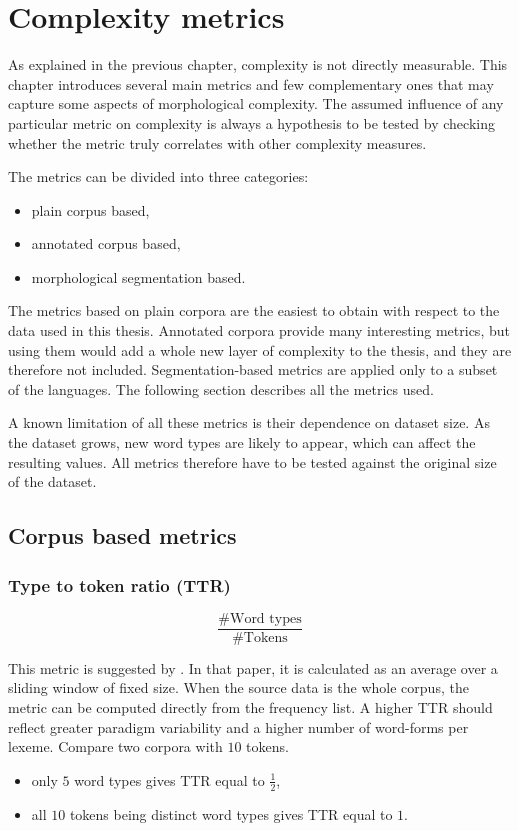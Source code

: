 \chapter{Complexity metrics}
\label{sec:metrics}

As explained in the previous chapter, complexity is not directly measurable. This chapter introduces several main metrics and few complementary ones that may capture some aspects of morphological complexity. The assumed influence of any particular metric on complexity is always a hypothesis to be tested by checking whether the metric truly correlates with other complexity measures.

The metrics can be divided into three categories:

\begin{itemize}
    \item plain corpus based,
    \item annotated corpus based,
    \item morphological segmentation based.
\end{itemize}

The metrics based on plain corpora are the easiest to obtain with respect to the data used in this thesis. Annotated corpora provide many interesting metrics, but using them would add a whole new layer of complexity to the thesis, and they are therefore not included. Segmentation-based metrics are applied only to a subset of the languages. The following section describes all the metrics used.

A known limitation of all these metrics is their dependence on dataset size. As the dataset grows, new word types are likely to appear, which can affect the resulting values. All metrics therefore have to be tested against the original size of the dataset.

\newpage{}
\section{Corpus based metrics}

\subsection{Type to token ratio (TTR)}

$$
\frac{\text{\# Word types}}{\text{\# Tokens}}
$$

This metric is suggested by \textcite{Coltekin2022}. In that paper, it is calculated as an average over a sliding window of fixed size. When the source data is the whole corpus, the metric can be computed directly from the frequency list. A higher TTR should reflect greater paradigm variability and a higher number of word-forms per lexeme. Compare two corpora with $10$ tokens.
\begin{itemize}
    \item only $5$ word types gives TTR equal to $\frac{1}{2}$,
    \item all $10$ tokens being distinct word types gives TTR equal to $1$.
\end{itemize}

